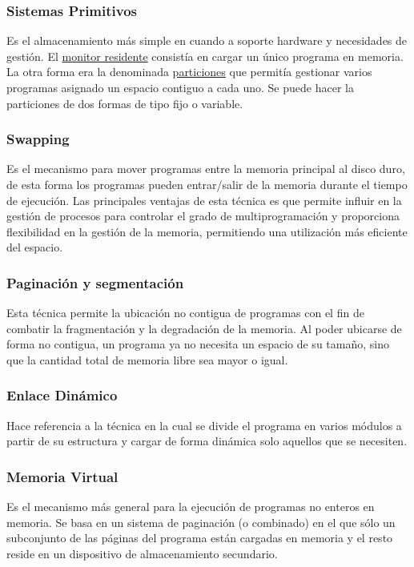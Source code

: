 \documentclass{article}
\begin{document}
\subsubsection{Sistemas Primitivos}
Es el almacenamiento más simple en cuando a soporte hardware y necesidades de gestión. El \underline{monitor residente} consistía en cargar un único programa en memoria. La otra forma era la denominada \underline{particiones} que permitía gestionar varios programas asignado un espacio contiguo a cada uno. Se puede hacer la particiones de dos formas de tipo fijo o variable.

\subsubsection{Swapping}
Es el mecanismo para mover programas entre la memoria principal al disco duro, de esta forma los programas pueden entrar/salir de la memoria durante el tiempo de ejecución. Las principales ventajas de esta técnica es que permite influir en la gestión de procesos para controlar el grado de multiprogramación y proporciona flexibilidad en la gestión de la memoria, permitiendo una utilización más eficiente del espacio.

\subsubsection{Paginación y segmentación}
Esta técnica permite la ubicación no contigua de programas con el fin de combatir la fragmentación y la degradación de la memoria. Al poder ubicarse de forma no contigua, un programa ya no necesita un espacio de su tamaño, sino que la cantidad total de memoria libre sea mayor o igual.

\subsubsection{Enlace Dinámico}
Hace referencia a la técnica en la cual se divide el programa en varios módulos a partir de su estructura y cargar de forma dinámica solo aquellos que se necesiten.
\subsubsection{Memoria Virtual}
Es el mecanismo más general para la ejecución de programas no enteros en memoria. Se basa en un sistema de paginación (o combinado) en el que sólo un subconjunto de las páginas del programa están cargadas en memoria y el resto reside en un dispositivo de almacenamiento secundario.
\end{document}
